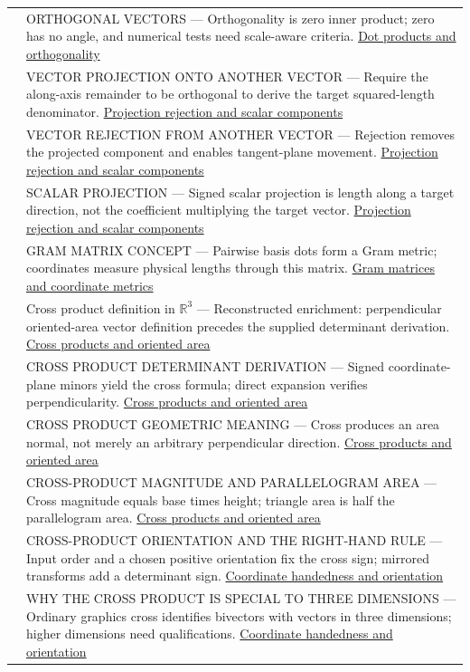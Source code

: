 {\begin{longtable}[]{@{}
  >{\raggedright\arraybackslash}p{}
  >{\raggedright\arraybackslash}p{}@{}}
537 & ORTHOGONAL VECTORS --- Orthogonality is zero inner product; zero has no angle, and numerical tests need scale-aware criteria. \hyperref[appendix-8bc4e8fc547c]{Dot products and orthogonality} \\
538 & VECTOR PROJECTION ONTO ANOTHER VECTOR --- Require the along-axis remainder to be orthogonal to derive the target squared-length denominator. \hyperref[appendix-505a502c372a]{Projection rejection and scalar components} \\
539 & VECTOR REJECTION FROM ANOTHER VECTOR --- Rejection removes the projected component and enables tangent-plane movement. \hyperref[appendix-505a502c372a]{Projection rejection and scalar components} \\
540 & SCALAR PROJECTION --- Signed scalar projection is length along a target direction, not the coefficient multiplying the target vector. \hyperref[appendix-505a502c372a]{Projection rejection and scalar components} \\
541 & GRAM MATRIX CONCEPT --- Pairwise basis dots form a Gram metric; coordinates measure physical lengths through this matrix. \hyperref[appendix-3b863809f82a]{Gram matrices and coordinate metrics} \\
542 & Cross product definition in \(\mathbb R^3\) --- Reconstructed enrichment: perpendicular oriented-area vector definition precedes the supplied determinant derivation. \hyperref[appendix-2391db8052b1]{Cross products and oriented area} \\
543 & CROSS PRODUCT DETERMINANT DERIVATION --- Signed coordinate-plane minors yield the cross formula; direct expansion verifies perpendicularity. \hyperref[appendix-2391db8052b1]{Cross products and oriented area} \\
544 & CROSS PRODUCT GEOMETRIC MEANING --- Cross produces an area normal, not merely an arbitrary perpendicular direction. \hyperref[appendix-2391db8052b1]{Cross products and oriented area} \\
545 & CROSS-PRODUCT MAGNITUDE AND PARALLELOGRAM AREA --- Cross magnitude equals base times height; triangle area is half the parallelogram area. \hyperref[appendix-2391db8052b1]{Cross products and oriented area} \\
546 & CROSS-PRODUCT ORIENTATION AND THE RIGHT-HAND RULE --- Input order and a chosen positive orientation fix the cross sign; mirrored transforms add a determinant sign. \hyperref[appendix-87d7626c8d37]{Coordinate handedness and orientation} \\
547 & WHY THE CROSS PRODUCT IS SPECIAL TO THREE DIMENSIONS --- Ordinary graphics cross identifies bivectors with vectors in three dimensions; higher dimensions need qualifications. \hyperref[appendix-87d7626c8d37]{Coordinate handedness and orientation} \\

\end{longtable}}
